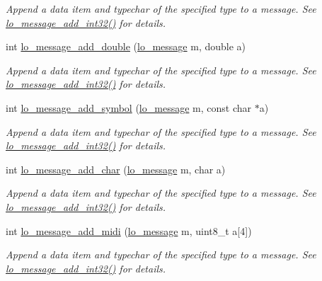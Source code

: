 \begin{DoxyCompactItemize}
\begin{DoxyCompactList}\small\item\em \-Append a data item and typechar of the specified type to a message. \-See \hyperlink{group__liblolowlevel_ga7c9df1bd975a32fb6c8105e6fe327149}{lo\-\_\-message\-\_\-add\-\_\-int32()} for details. \end{DoxyCompactList}\item 
int \hyperlink{group__liblolowlevel_gadd3a8441ad5a749c43694e77594cf47b}{lo\-\_\-message\-\_\-add\-\_\-double} (\hyperlink{lo__types_8h_ad126083c98d941f00eb72d1690b38d63}{lo\-\_\-message} m, double a)
\begin{DoxyCompactList}\small\item\em \-Append a data item and typechar of the specified type to a message. \-See \hyperlink{group__liblolowlevel_ga7c9df1bd975a32fb6c8105e6fe327149}{lo\-\_\-message\-\_\-add\-\_\-int32()} for details. \end{DoxyCompactList}\item 
int \hyperlink{group__liblolowlevel_ga90e4dab46ecaabab4e34214429d622a7}{lo\-\_\-message\-\_\-add\-\_\-symbol} (\hyperlink{lo__types_8h_ad126083c98d941f00eb72d1690b38d63}{lo\-\_\-message} m, const char $\ast$a)
\begin{DoxyCompactList}\small\item\em \-Append a data item and typechar of the specified type to a message. \-See \hyperlink{group__liblolowlevel_ga7c9df1bd975a32fb6c8105e6fe327149}{lo\-\_\-message\-\_\-add\-\_\-int32()} for details. \end{DoxyCompactList}\item 
int \hyperlink{group__liblolowlevel_gab2423db077dea59c4049103819d2810b}{lo\-\_\-message\-\_\-add\-\_\-char} (\hyperlink{lo__types_8h_ad126083c98d941f00eb72d1690b38d63}{lo\-\_\-message} m, char a)
\begin{DoxyCompactList}\small\item\em \-Append a data item and typechar of the specified type to a message. \-See \hyperlink{group__liblolowlevel_ga7c9df1bd975a32fb6c8105e6fe327149}{lo\-\_\-message\-\_\-add\-\_\-int32()} for details. \end{DoxyCompactList}\item 
int \hyperlink{group__liblolowlevel_gaaea6ac25787de608199a988dc214f32e}{lo\-\_\-message\-\_\-add\-\_\-midi} (\hyperlink{lo__types_8h_ad126083c98d941f00eb72d1690b38d63}{lo\-\_\-message} m, uint8\-\_\-t a\mbox{[}4\mbox{]})
\begin{DoxyCompactList}\small\item\em \-Append a data item and typechar of the specified type to a message. \-See \hyperlink{group__liblolowlevel_ga7c9df1bd975a32fb6c8105e6fe327149}{lo\-\_\-message\-\_\-add\-\_\-int32()} for details. \end{DoxyCompactList}\item 

\end{DoxyCompactItemize}
